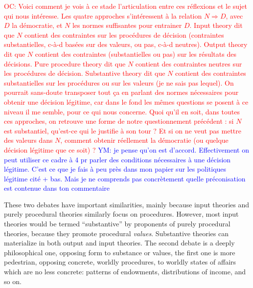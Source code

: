 \documentclass[preprint, french, english, 11pt]{elsarticle}%
\newcommand{\commentYM}[1]{\textcolor{blue}{YM: #1}}
\newcommand{\commentOC}[1]{\textcolor{red}{OC: #1}}
\begin{document}
\commentOC{Voici comment je vois à ce stade l’articulation entre ces réflexions et le sujet qui nous intéresse. Les quatre approches s’intéressent à la relation $N ⇒ D$, avec $D$ la démocratie, et $N$ les normes suffisantes pour entrainer $D$. Input theory dit que $N$ contient des contraintes sur les procédures de décision (contraintes substantielles, c-à-d basées sur des valeurs, ou pas, c-à-d neutres). Output theory dit que $N$ contient des contraintes (substantielles ou pas) sur les résultats des décisions. Pure procedure theory dit que $N$ contient des contraintes neutres sur les procédures de décision. Substantive theory dit que $N$ contient des contraintes substantielles sur les procédures ou sur les valeurs (je ne sais pas lequel). On pourrait sans-doute transposer tout ça en parlant des normes nécessaires pour obtenir une décision légitime, car dans le fond les mêmes questions se posent à ce niveau il me semble, pour ce qui nous concerne. Quoi qu’il en soit, dans toutes ces approches, on retrouve une forme de notre questionnement précédent : si $N$ est substantiel, qu’est-ce qui le justifie à son tour ? Et si on ne veut pas mettre des valeurs dans $N$, comment obtenir réellement la démocratie (ou quelque décision légitime que ce soit) ?}
\commentYM{je pense qu'on est d'accord. Effectivement on peut utiliser ce cadre à 4 pr parler des conditions nécessaires à une décision légitime. C'est ce que je fais à peu près dans mon papier sur les politiques légitime cité + bas. Mais je ne comprends pas concrètement quelle préconisation est contenue dans ton commentaire}

These two debates have important similarities, mainly because input theories and purely procedural theories similarly focus on procedures. However, most input theories would be termed ``substantive'' by proponents of purely procedural theories, because they promote procedural \emph{values}. Substantive theories can materialize in both output and input theories. The second debate is a deeply philosophical one, opposing form to substance or values, the first one is more pedestrian, opposing concrete, worldly procedures, to worldly states of affairs which are no less concrete: patterns of endowments, distributions of income, and so on.
\end{document}
